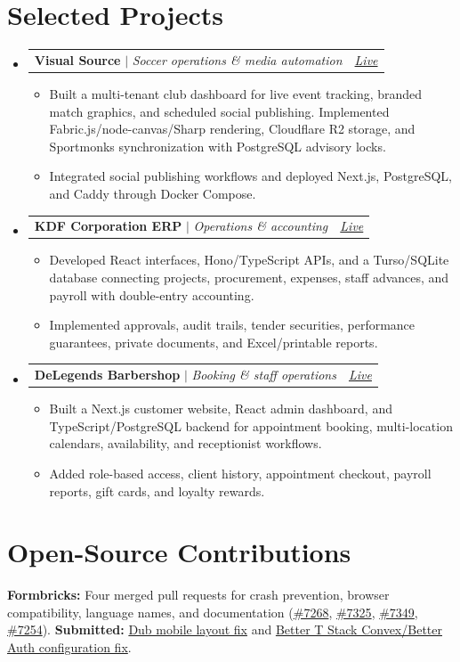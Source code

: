 \documentclass[letterpaper,11pt]{article}
\makeatletter
\newcommand{\resumeItem}[1]{
  \item\small{#1 \vspace{-1pt}}
}
\newcommand{\resumeProjectHeading}[2]{
    \item
    \begin{tabular*}{0.97\textwidth}{l@{\extracolsep{\fill}}r}
      \small#1 & \textit{\small #2} \\
    \end{tabular*}\vspace{-6pt}
}
\newcommand{\resumeSubHeadingListStart}{\begin{itemize}[leftmargin=0.15in, label={}]}
\newcommand{\resumeSubHeadingListEnd}{\end{itemize}}
\newcommand{\resumeItemListStart}{\begin{itemize}[itemsep=1pt]}
\newcommand{\resumeItemListEnd}{\end{itemize}\vspace{-5pt}}
\makeatother
\begin{document}
\section{Selected Projects}
  \resumeSubHeadingListStart
    \resumeProjectHeading
      {\textbf{Visual Source} $|$ \emph{Soccer operations \& media automation}}{\href{https://my.visualsource.nl/}{Live}}
      \resumeItemListStart
        \resumeItem{Built a multi-tenant club dashboard for live event tracking, branded match graphics, and scheduled social publishing. Implemented Fabric.js/node-canvas/Sharp rendering, Cloudflare R2 storage, and Sportmonks synchronization with PostgreSQL advisory locks.}
        \resumeItem{Integrated social publishing workflows and deployed Next.js, PostgreSQL, and Caddy through Docker Compose.}
      \resumeItemListEnd
    \resumeProjectHeading
      {\textbf{KDF Corporation ERP} $|$ \emph{Operations \& accounting}}{\href{https://kdfcorporation.qom.bd/}{Live}}
      \resumeItemListStart
        \resumeItem{Developed React interfaces, Hono/TypeScript APIs, and a Turso/SQLite database connecting projects, procurement, expenses, staff advances, and payroll with double-entry accounting.}
        \resumeItem{Implemented approvals, audit trails, tender securities, performance guarantees, private documents, and Excel/printable reports.}
      \resumeItemListEnd
    \resumeProjectHeading
      {\textbf{DeLegends Barbershop} $|$ \emph{Booking \& staff operations}}{\href{https://app.delegendsbarbershop.lt/}{Live}}
      \resumeItemListStart
        \resumeItem{Built a Next.js customer website, React admin dashboard, and TypeScript/PostgreSQL backend for appointment booking, multi-location calendars, availability, and receptionist workflows.}
        \resumeItem{Added role-based access, client history, appointment checkout, payroll reports, gift cards, and loyalty rewards.}
      \resumeItemListEnd
  \resumeSubHeadingListEnd

\section{Open-Source Contributions}
\small{\textbf{Formbricks:} Four merged pull requests for crash prevention, browser compatibility, language names, and documentation (\href{https://github.com/formbricks/formbricks/pull/7268}{\#7268}, \href{https://github.com/formbricks/formbricks/pull/7325}{\#7325}, \href{https://github.com/formbricks/formbricks/pull/7349}{\#7349}, \href{https://github.com/formbricks/formbricks/pull/7254}{\#7254}). \textbf{Submitted:} \href{https://github.com/dubinc/dub/pull/3501}{Dub mobile layout fix} and \href{https://github.com/AmanVarshney01/create-better-t-stack/pull/1264}{Better T Stack Convex/Better Auth configuration fix}.}
\end{document}
